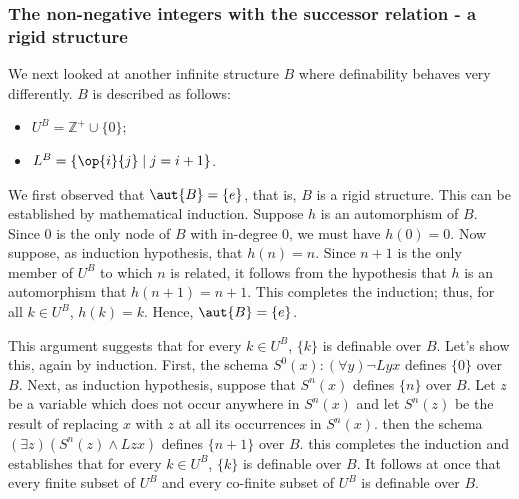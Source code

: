 \iffalse
At this point, one of you raised a very interesting question: to what extent can the structure $A$ itself be specified by a schema. As we'd already discussed:
\begin{theorem}
If $D$ is a finite graph, then there is a schema $S$ such that for every graph $D'$, 
\[
D'\models S \mbox{ if and only if } D'\cong D.
\]
\end{theorem}
The following result, in sharp contrast, shows that \emph{no} infinite structure can be perfectly described by schemata. In order to state the result, we need to define $\theo{D}$, the \emph{complete theory of} $D$:
\[
\theo{D} = \{S\mid S \mbox{ is a schema and } D\models S\}. 
\]
\begin{theorem}\label{infnotcat-thm}
For every infinite graph $D$, there is a graph $D'$, $D'\models\theo{D}$ and $D'\not\cong D$.
\end{theorem}
Theorem \ref{infnotcat-thm} is a corollary to the Compactness Theorem for polyadic quantification theory, a fundamental result we will study next week.
\fi
\subsubsection{The non-negative integers with the successor relation - a rigid structure}

We next looked at another infinite structure $B$ where definability behaves very differently. $B$ is described as follows:
\begin{itemize}
\item
$U^B= \mathbb{Z}^+\cup\{0\}$;
\item
$L^B=\{\op{i}{j}\mid j=i+1\}$.
\end{itemize}

We first observed that $\aut{B}=\{e\}$, that is, $B$ is a rigid structure. 
This can be established by mathematical induction. Suppose $h$ is an automorphism of $B$. Since $0$ is the only node of $B$ with in-degree $0$, we must have $h(0)=0$. Now suppose, as induction hypothesis, that $h(n)=n$. Since $n+1$ is the only member of $U^B$ to which $n$ is related, it follows from the hypothesis that $h$ is an automorphism that $h(n+1)=n+1$. This completes the induction; thus, for all $k\in U^B$, $h(k)=k$. Hence, $\aut{B}=\{e\}$. 

This argument suggests that for every $k\in U^B$, $\{k\}$ is definable over $B$. Let's show this, again by induction. First, the schema $S^0(x): (\forall y)\neg Lyx$ defines $\{0\}$ over $B$. Next, as induction hypothesis, suppose that $S^n(x)$ defines $\{n\}$ over $B$. Let $z$ be a variable which does not occur anywhere in $S^n(x)$ and let $S^n(z)$ be the result of replacing $x$ with $z$ at all its occurrences in $S^n(x)$. then the schema $(\exists z)(S^n(z)\wedge Lzx)$ defines $\{n+1\}$ over $B$. this completes the induction and establishes that for every $k\in U^B$, $\{k\}$ is definable over $B$. It follows at once that every finite subset of $U^B$ and every co-finite subset of $U^B$ is definable over $B$. 

